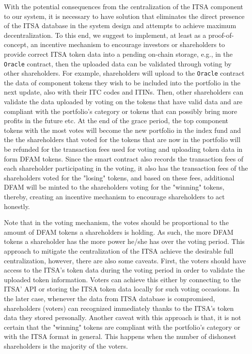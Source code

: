 With the potential consequences from the centralization of the ITSA component to our system, it is necessary to have solution that eliminates the direct presence of the ITSA database in the system design and attempts to achieve maximum decentralization. To this end, we suggest to implement, at least as a proof-of-concept, an incentive mechanism to encourage investors or shareholders to provide correct ITSA token data into a pending on-chain storage, e.g., in the \texttt{Oracle} contract, then the uploaded data can be validated through voting by other shareholders. For example, shareholders will upload to the \texttt{Oracle} contract the data of component tokens they wish to be included into the portfolio in the next update, also with their ITC codes and ITINs. Then, other shareholders can validate the data uploaded by voting on the tokens that have valid data and are compliant with the portfolio's category or tokens that can possibly bring more profits in the future etc. At the end of the grace period, the top component tokens with the most votes will become the new portfolio in the index fund and the the shareholders that voted for the tokens that are now in the portfolio will be refunded for the transaction fees used for voting and uploading token data in form DFAM tokens. Since the smart contract also records the transaction fees of each shareholder participating in the voting, it also has the transaction fees of the shareholders voted for the "losing" tokens, and based on these fees, additional DFAM will be minted to the shareholders voting for the "winning" tokens, thereby, creating an incentive mechanism to encourage shareholders to act honestly.

Note that in the voting mechanism, the votes should be proportional to the amount of DFAM tokens a shareholders is holding. As such, the more DFAM tokens a shareholder has the more power he/she has over the voting period. This approach to mitigate the centralization of the ITSA achieve the desirable full centralization, however, there are also some caveats. First, the voters should have access to the ITSA's token data during the voting period in order to validate the uploaded token information. Voters can achieve this either by connecting to the ITSA' API or storing the ITSA token data locally for such voting occasions. In the later case, whenever the data from ITSA database is compromised, shareholders (voters) can recognized immediately thanks to the ITSA's token data they stored personally. Another caveat with this approach is that, it is not certain that the "winning" tokens are compliant with the portfolio's category or with the ITSA format in general. This happens when the number of dishonest shareholders is the majority of the voters. 



